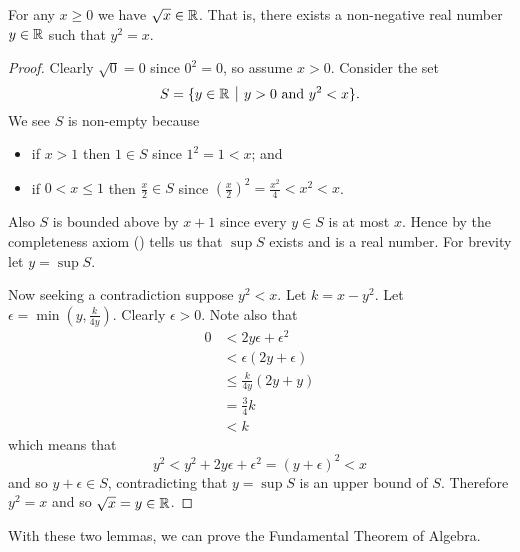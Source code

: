 \begin{lemma}\label{lemma-non-negative-real-number-has-square-root}
    For any $x \geq 0$ we have $\sqrt{x} \in \mathbb{R}$. That is, there exists a non-negative real number $y \in \mathbb{R}$ such that $y^2 = x$.
\end{lemma}
\begin{proof}
    Clearly $\sqrt0=0$ since $0^2=0$, so assume $x > 0$. Consider the set
    \[
        S = \{y \in \R \vert y > 0 \text{ and } y^2 < x\}.
    \]
    We see $S$ is non-empty because
    \begin{itemize}
        \item if $x > 1$ then $1 \in S$ since $1^2 = 1 < x$; and
        \item if $0 < x \leq 1$ then $\frac x2 \in S$ since $\left(\frac x2\right)^2 = \frac{x^2}4 < x^2 < x$.
    \end{itemize}
    Also $S$ is bounded above by $x + 1$ since every $y \in S$ is at most $x$. Hence by the completeness axiom () tells us that $\sup S$ exists and is a real number. For brevity let $y = \sup S$.

    Now seeking a contradiction suppose $y^2 < x$. Let $k = x - y^2$. Let $\epsilon = \min(y, \frac{k}{4y})$. Clearly $\epsilon > 0$. Note also that
    \begin{align*}
        0 &< 2y\epsilon + \epsilon^2\\
        &<\epsilon(2y + \epsilon)\\
        &\leq \frac{k}{4y}(2y + y)\\
        &= \frac 34 k\\
        &< k
    \end{align*}
    which means that
    \[
        y^2 < y^2 + 2y\epsilon + \epsilon^2 = (y+\epsilon)^2 < x
    \]
    and so $y + \epsilon \in S$, contradicting that $y = \sup S$ is an upper bound of $S$. Therefore $y^2 = x$ and so $\sqrt x = y \in \mathbb{R}$.
\end{proof}

With these two lemmas, we can prove the Fundamental Theorem of Algebra.

